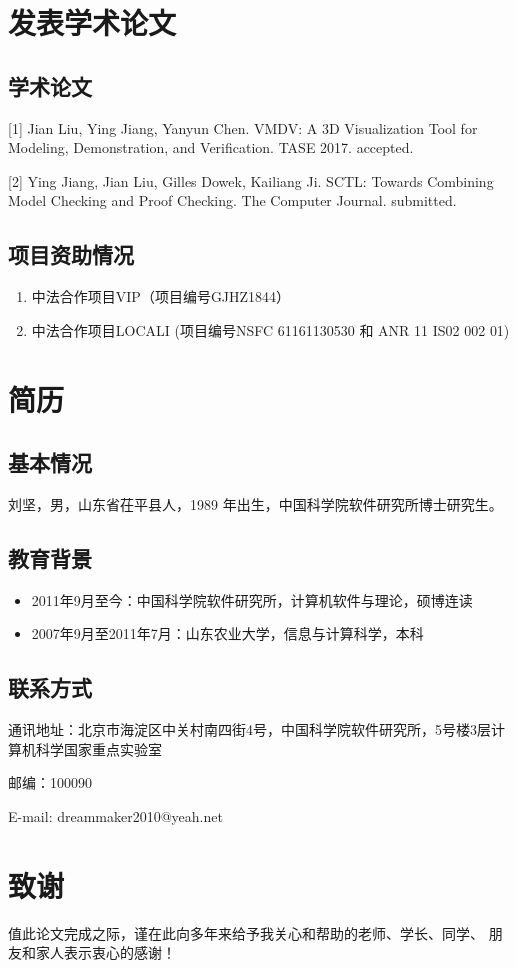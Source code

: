 \chapter{发表学术论文}

\section*{学术论文}

\hspace{-0.9cm}[1] Jian Liu, Ying Jiang, Yanyun Chen. VMDV: A 3D Visualization Tool for Modeling, Demonstration, and Verification. TASE 2017. accepted.

\hspace{-0.9cm}[2] Ying Jiang, Jian Liu, Gilles Dowek, Kailiang Ji. SCTL: Towards Combining Model Checking and Proof Checking. The Computer Journal. submitted.

\section*{项目资助情况}
\begin{enumerate}
	\item 中法合作项目VIP（项目编号GJHZ1844）
	\item 中法合作项目LOCALI (项目编号NSFC 61161130530 和 ANR 11 IS02 002 01)
\end{enumerate}



\chapter{简历}

\section*{基本情况}

刘坚，男，山东省茌平县人，1989 年出生，中国科学院软件研究所博士研究生。

\section*{教育背景}
\begin{itemize}
	\item 2011年9月至今：中国科学院软件研究所，计算机软件与理论，硕博连读
	\item 2007年9月至2011年7月：山东农业大学，信息与计算科学，本科
\end{itemize}

\section*{联系方式}

通讯地址：北京市海淀区中关村南四街4号，中国科学院软件研究所，5号楼3层计算机科学国家重点实验室

邮编：100090

E-mail: dreammaker2010@yeah.net



\chapter{致\quad 谢}

值此论文完成之际，谨在此向多年来给予我关心和帮助的老师、学长、同学、
朋友和家人表示衷心的感谢！

